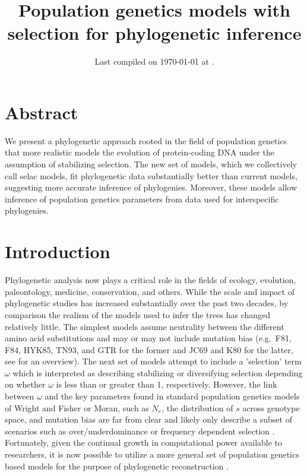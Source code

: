\documentclass{article}
\title{Population genetics models with selection for phylogenetic
inference} \date{Last compiled on \today\xspace at \currenttime.}
\newcommand{\Ne}{\ensuremath{{N_e}}\xspace} %
\begin{document}
\maketitle


\section*{Abstract}
We present a phylogenetic approach rooted in the field of population genetics that more realistic models the evolution of protein-coding DNA under the assumption of stabilizing selection.
The new set of models, which we collectively call selac models, fit phylogenetic data substantially better than current models, suggesting more accurate inference of phylogenies.
Moreover, these models allow inference of population genetics parameters from data used for interspecific phylogenies.

\section*{Introduction}
Phylogenetic analysis now plays a critical role in the fields of ecology, evolution, paleontology, medicine, conservation, and others.
While the scale and impact of phylogenetic studies has increased substantially over the past two decades, by comparison the realism of the models used to infer the trees has changed relatively little.
The simplest models assume neutrality between the different amino acid substitutions and may or may not include mutation bias (e.g.~F81, F84, HYK85, TN93, and GTR for the former and JC69 and K80 for the latter, see \citet{Yang2014} for an overview).
The next set of models attempt to include a 'selection' term $\omega$ which is interpreted as describing stabilizing or diversifying selection depending on whether $\omega$ is less than or greater than 1, respectively. 
However, the link between $\omega$ and the key parameters found in standard population genetics models of Wright and Fisher or Moran, such as \Ne, the distribution of $s$ across genotype space, and mutation bias are far from clear and likely only describe a subset of scenarios such as over/underdominance or frequency dependent selection  \citep{HughesAndNei1988}.
Fortunately, given the continual growth in computational power available to researchers, it is now possible to utilize a more general set of population genetics based models for the purpose of phylogenetic reconstruction \citep[e.g.][]{HalpernAndBruno1998,RobinsonEtAl2003,LartillotAndPhilippe2004,RodrigueAndLartillot2014}.
\end{document}
